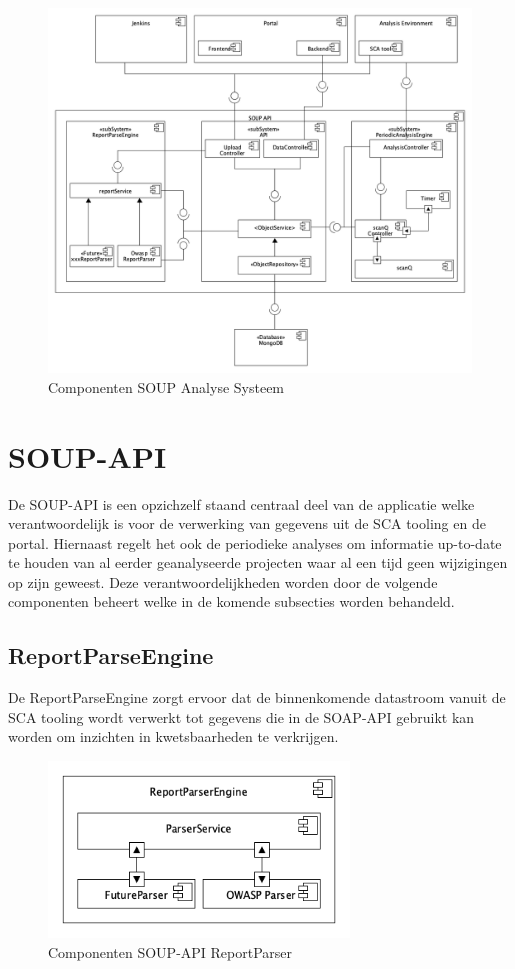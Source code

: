 \begin{figure}[bth]
    \myfloatalign
    \includegraphics[width=17cm]{gfx/umlet/exports/ApplicationComponents}
    \caption{Componenten SOUP Analyse Systeem}
    \label{fig:SOUP-Components}
\end{figure}
\clearpage
\section{SOUP-API}\label{sec:soup-api}
De SOUP-API is een opzichzelf staand centraal deel van de applicatie welke verantwoordelijk is voor de verwerking van gegevens uit de SCA tooling en de portal. Hiernaast regelt het ook de periodieke analyses om informatie up-to-date te houden van al eerder geanalyseerde projecten waar al een tijd geen wijzigingen op zijn geweest. Deze verantwoordelijkheden worden door de volgende componenten beheert welke in de komende subsecties worden behandeld.

\subsection{ReportParseEngine}\label{subsec:reportparseengine}
De ReportParseEngine zorgt ervoor dat de binnenkomende datastroom vanuit de SCA tooling wordt verwerkt tot gegevens die in de SOAP-API gebruikt kan worden om inzichten in kwetsbaarheden te verkrijgen.

\begin{figure}[bth]
    \myfloatalign
    \includegraphics[width=8cm]{gfx/umlet/exports/ReportParserComponents}
    \caption{Componenten SOUP-API ReportParser}
    \label{fig:SOUPAPIReportParserComps}
\end{figure}

